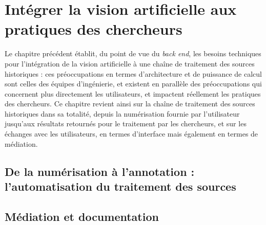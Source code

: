 \documentclass[a4paper,12pt,twoside]{book}
\begin{document}
      	\chapter[\textit{Computer vision} et pratiques des chercheurs]{Intégrer la vision artificielle aux pratiques des chercheurs}
      	Le chapitre précédent établit, du point de vue du \textit{back end}, les besoins techniques pour l'intégration de la vision artificielle à une chaîne de traitement des sources historiques : ces préoccupations en termes d'architecture et de puissance de calcul sont celles des équipes d'ingénierie, et existent en parallèle des préoccupations qui concernent plus directement les utilisateurs, et impactent réellement les pratiques des chercheurs. Ce chapitre revient ainsi sur la chaîne de traitement des sources historiques dans sa totalité, depuis la numérisation fournie par l'utilisateur jusqu'aux résultats retournés pour le traitement par les chercheurs, et sur les échanges avec les utilisateurs, en termes d'interface mais également en termes de médiation.
               
            \section[\textit{Workflow} de traitement des sources]{De la numérisation à l’annotation : l'automatisation du traitement des sources}
                
         
            \section{Médiation et documentation}
                
        	\\
        
\end{document}
